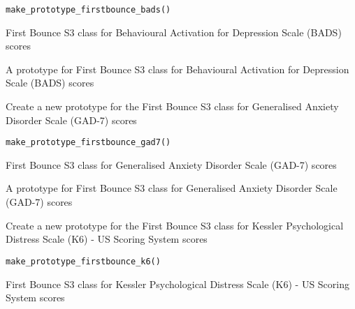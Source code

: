\documentclass[a4paper]{book}
\begin{document}
%
\begin{Usage}
\begin{verbatim}
make_prototype_firstbounce_bads()
\end{verbatim}
\end{Usage}
%
\begin{Details}\relax
First Bounce S3 class for Behavioural Activation for Depression Scale (BADS) scores
\end{Details}
%
\begin{Value}
A prototype for First Bounce S3 class for Behavioural Activation for Depression Scale (BADS) scores
\end{Value}
%
\begin{Description}\relax
Create a new prototype for the First Bounce S3 class for Generalised Anxiety Disorder Scale (GAD-7) scores
\end{Description}
%
\begin{Usage}
\begin{verbatim}
make_prototype_firstbounce_gad7()
\end{verbatim}
\end{Usage}
%
\begin{Details}\relax
First Bounce S3 class for Generalised Anxiety Disorder Scale (GAD-7) scores
\end{Details}
%
\begin{Value}
A prototype for First Bounce S3 class for Generalised Anxiety Disorder Scale (GAD-7) scores
\end{Value}
%
\begin{Description}\relax
Create a new prototype for the First Bounce S3 class for Kessler Psychological Distress Scale (K6) - US Scoring System scores
\end{Description}
%
\begin{Usage}
\begin{verbatim}
make_prototype_firstbounce_k6()
\end{verbatim}
\end{Usage}
%
\begin{Details}\relax
First Bounce S3 class for Kessler Psychological Distress Scale (K6) - US Scoring System scores
\end{Details}
\end{document}
